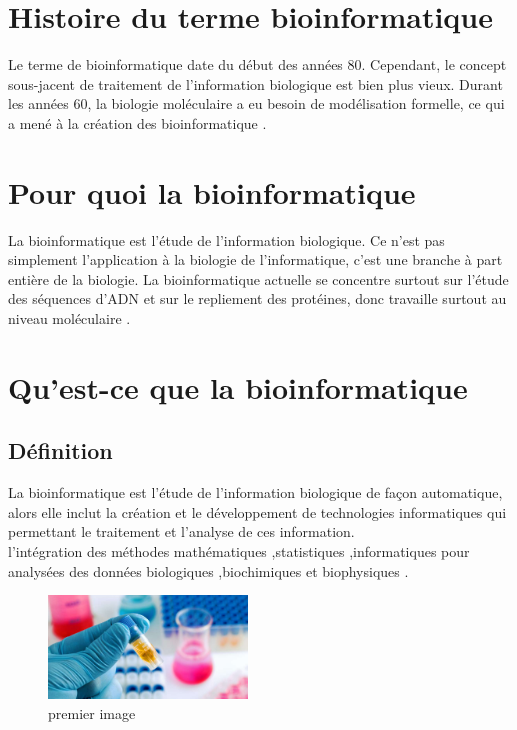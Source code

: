 \documentclass[12pt]{report}
\begin{document}
\section{Histoire du terme bioinformatique}
Le terme de bioinformatique date du début des années 80. Cependant, le concept sous-jacent de traitement de l'information biologique est bien plus vieux. Durant les années 60, la biologie moléculaire a eu besoin de modélisation formelle, ce qui a mené à la création des bioinformatique \cite{ref19}.\\
\section{Pour quoi la bioinformatique}
La bioinformatique est l'étude de l'information biologique. Ce n'est pas simplement l'application à la biologie de l'informatique, c'est une branche à part entière de la biologie. La bioinformatique actuelle se concentre surtout sur l'étude des séquences d'ADN et sur le repliement des protéines, donc travaille surtout au niveau moléculaire \cite{ref19} . 
\section{Qu'est-ce que la bioinformatique }
\subsection{Définition}
La bioinformatique est l'étude de l'information biologique de façon automatique, alors elle inclut la création et le développement de technologies informatiques qui permettant le traitement et l'analyse de ces information.
\\
l'intégration des méthodes mathématiques ,statistiques ,informatiques  pour analysées des données biologiques ,biochimiques et biophysiques \cite{ref20} .

\begin{figure}[h]

\includegraphics[width=200]{bb.jpg} 
\caption{premier image}
\label{premier image}

\end{figure}
\end{document}
